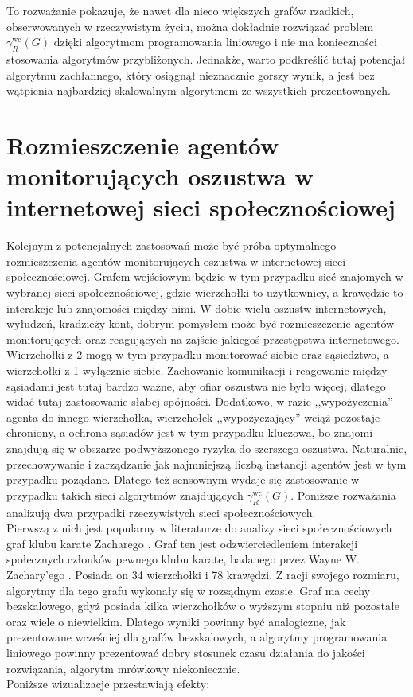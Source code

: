 To rozważanie pokazuje, że nawet dla nieco większych grafów rzadkich, obserwowanych w rzeczywistym życiu, można dokładnie rozwiązać problem $\gamma^{\text{wc}}_R(G)$ dzięki algorytmom programowania liniowego i nie ma konieczności stosowania algorytmów przybliżonych. Jednakże, warto podkreślić tutaj potencjał algorytmu zachłannego, który osiągnął nieznacznie gorszy wynik, a jest bez wątpienia najbardziej skalowalnym algorytmem ze wszystkich prezentowanych.

\section{Rozmieszczenie agentów monitorujących oszustwa w internetowej sieci społecznościowej}

Kolejnym z potencjalnych zastosowań może być próba optymalnego rozmieszczenia agentów monitorujących oszustwa w internetowej sieci społecznościowej. Grafem wejściowym będzie w tym przypadku sieć znajomych w wybranej sieci społecznościowej, gdzie wierzchołki to użytkownicy, a krawędzie to interakcje lub znajomości między nimi. W dobie wielu oszustw internetowych, wyłudzeń, kradzieży kont, dobrym pomysłem może być rozmieszczenie agentów monitorujących oraz reagujących na zajście jakiegoś przestępstwa internetowego. Wierzchołki z 2 mogą w tym przypadku monitorować siebie oraz sąsiedztwo, a wierzchołki z 1 wyłącznie siebie. Zachowanie komunikacji i reagowanie między sąsiadami jest tutaj bardzo ważne, aby ofiar oszustwa nie było więcej, dlatego widać tutaj zastosowanie słabej spójności. Dodatkowo, w razie ,,wypożyczenia'' agenta do innego wierzchołka, wierzchołek ,,wypożyczający'' wciąż pozostaje chroniony, a ochrona sąsiadów jest w tym przypadku kluczowa, bo znajomi znajdują się w obszarze podwyższonego ryzyka do szerszego oszustwa. Naturalnie, przechowywanie i zarządzanie jak najmniejszą liczbą instancji agentów jest w tym przypadku pożądane. Dlatego też sensownym wydaje się zastosowanie w przypadku takich sieci algorytmów znajdujących $\gamma^{\text{wc}}_R(G)$. Poniższe rozważania analizują dwa przypadki rzeczywistych sieci społecznościowych.\\

 Pierwszą z nich jest popularny w literaturze do analizy sieci społecznościowych graf klubu karate Zacharego \cite{KARATE}. Graf ten jest odzwierciedleniem interakcji społecznych członków pewnego klubu karate, badanego przez Wayne W. Zachary'ego \cite{ZACHARY}. Posiada on 34 wierzchołki i 78 krawędzi. Z racji swojego rozmiaru, algorytmy dla tego grafu wykonały się w rozsądnym czasie. Graf ma cechy bezskalowego, gdyż posiada kilka wierzchołków o wyższym stopniu niż pozostałe oraz wiele o niewielkim. Dlatego wyniki powinny być analogiczne, jak prezentowane wcześniej dla grafów bezskalowych, a algorytmy programowania liniowego powinny prezentować dobry stosunek czasu działania do jakości rozwiązania, algorytm mrówkowy niekoniecznie. \\
 Poniższe wizualizacje przestawiają efekty:

